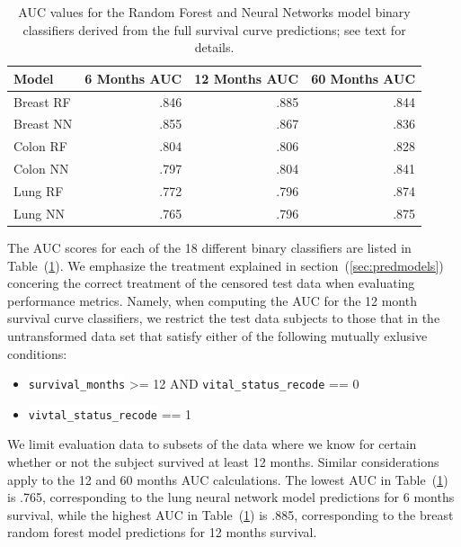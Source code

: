 \documentclass[a4paper,11pt]{article}
\newcommand{\codewhite}[1]{\colorbox{white}{\texttt{#1}}}
\begin{document}
\begin{table}[tbp]
\begin{center}
\begin{tabular}{lrrr}
\toprule
Model & 6 Months AUC & 12 Months AUC & 60 Months AUC \\ 
\midrule
Breast RF &  .846       &     .885           &  .844 \\ 
Breast NN &   .855      &     .867      &    .836 \\ 
Colon RF  &     .804          &      .806           &      .828           \\ 
Colon NN   &     .797          &          .804         &   .841  \\ 
Lung RF    &      .772               &        .796               &   .874  \\ 
Lung NN    &        .765              &        .796               &  .875  \\
\bottomrule
\end{tabular}
\caption{\label{tab:AUC} AUC values for the Random Forest and Neural Networks model
binary classifiers derived from the full survival curve predictions; see text for details.}
\end{center}
\end{table}

The AUC scores for each of the 18 different binary classifiers are listed in Table~(\ref{tab:AUC}). We emphasize the treatment explained in section~(\ref{sec:predmodels})  concering the correct treatment of the censored test data when evaluating performance metrics.
Namely, when computing the AUC for the 12 month survival curve classifiers, we restrict the test data subjects to those that in the untransformed data set that satisfy either of the following mutually exlusive conditions:

\begin{itemize}[noitemsep]
\item \codewhite{survival\_months} >= 12 AND \codewhite{vital\_status\_recode} == 0
\item \codewhite{vivtal\_status\_recode} == 1
\end{itemize}

We limit evaluation data to subsets of the data where we know for certain whether or not the subject survived at least 12 months. Similar considerations apply to the 12 and 60 months AUC calculations. The lowest AUC in Table~(\ref{tab:AUC}) is .765, corresponding to the lung neural network model predictions for 6 months survival, while the highest AUC in Table~(\ref{tab:AUC}) is .885, corresponding to the breast random forest model predictions for 12 months survival.
\end{document}
